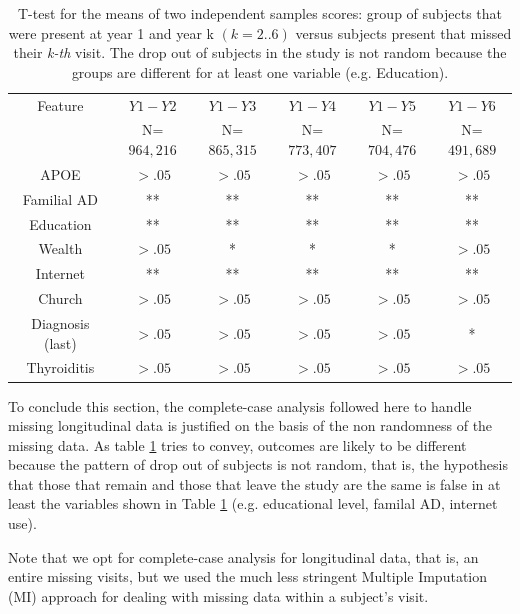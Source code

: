 \documentclass[11pt]{article}
\theoremstyle{definition}
\theoremstyle{remark}
\begin{document}
\begin{table}
  \centering
\begin{tabular}{cccccc} \toprule
    {Feature}   & {${Y1-Y2}$} & {${Y1-Y3}$} & {${Y1-Y4}$} & {${Y1-Y5}$} & {${Y1-Y6}$} \\ 
                & N={${964,216}$} & N={${865,315}$} & N={${773,407}$} & N={${704,476}$} & N={${491,689}$} \\  \midrule
    {APOE}           & $>.05$ & $>.05$ & $>.05$ & $>.05$ & $>.05$ \\
    {Familial AD}    & ** & ** & ** & ** & ** \\ %
    {Education}      & ** & ** & ** & ** & ** \\
    {Wealth}         & $>.05$  & *  & *  & * & $>.05$ \\ 
    {Internet}       & ** & ** & ** & ** & ** \\ 
    {Church}         & $>.05$ & $>.05$ & $>.05$ & $>.05$ & $>.05$  \\
    {Diagnosis (last)} & $>.05$ & $>.05$ & $>.05$ & $>.05$ & *  \\
    {Thyroiditis}    & $>.05$ & $>.05$ & $>.05$ & $>.05$ & $>.05$  \\ \bottomrule
\end{tabular}
\caption{T-test for the means of two independent samples scores: 
group of subjects that were present at year 1 and year k $(k=2..6)$ versus subjects present that missed their \emph{k-th} visit. The drop out of subjects in the study is not random because the groups are different for at least one variable (e.g. Education).}
\label{tab:testloyals}
\end{table} 

To conclude this section, the complete-case analysis followed here to handle missing longitudinal data is justified on the basis of the non randomness of the missing data. As table \ref{tab:testloyals} tries to convey, outcomes are likely to be different because the pattern of drop out of subjects is not random, that is, the hypothesis that those that remain and those that leave the study are the same is false in at least the variables shown in Table \ref{tab:testloyals} (e.g. educational level, familal AD, internet use).

Note that we opt for complete-case analysis for longitudinal data, that is, an entire missing visits, but we used the much less stringent Multiple Imputation (MI) \cite{buuren2010mice} approach for dealing with missing data within a subject's visit.
\end{document}
